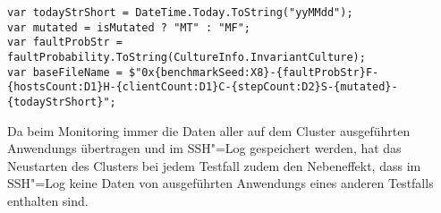 \begin{lstlisting}[label=lst:moveTestCaseLogs,style=cs,
caption={Bestimmung des Dateinamens zur Umbenennung der Logdateien}]
var todayStrShort = DateTime.Today.ToString("yyMMdd");
var mutated = isMutated ? "MT" : "MF";
var faultProbStr = faultProbability.ToString(CultureInfo.InvariantCulture);
var baseFileName = $"0x{benchmarkSeed:X8}-{faultProbStr}F-{hostsCount:D1}H-{clientCount:D1}C-{stepCount:D2}S-{mutated}-{todayStrShort}";
\end{lstlisting}

Da beim Monitoring immer die Daten aller auf dem Cluster ausgeführten \glspl{Anwendung} übertragen und im SSH"=Log gespeichert werden, hat das Neustarten des Clusters bei jedem \gls{Testfall} zudem den Nebeneffekt, dass im SSH"=Log keine Daten von ausgeführten \glspl{Anwendung} eines anderen Testfalls enthalten sind.
